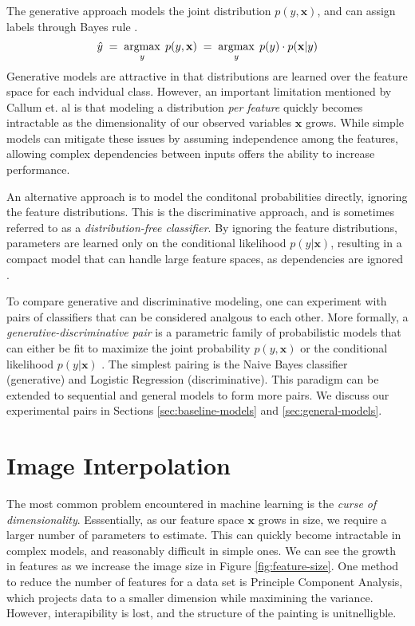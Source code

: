 \documentclass{article}
\DeclareMathOperator*{\argmax}{argmax}
\begin{document}
The generative approach models the joint distribution $p(y, \mathbf{x})$,
and can assign labels through Bayes rule \cite{NgJordan}.
\begin{equation}
    \hat{y} \; = \; \argmax_y \; p(y, \mathbf{x}) \; = \; \argmax_y \; p(y) \cdot p(\mathbf{x} | y) \\
\end{equation}
Generative models are attractive in that distributions are learned over the
feature space for each indvidual class. However, an important limitation
mentioned by Callum et. al \cite{McCallumCRF} is that modeling a distribution
\textit{per feature} quickly becomes intractable as the dimensionality of our
observed variables $\mathbf{x}$ grows. While simple models can mitigate
these issues by assuming independence among the features, allowing complex
dependencies between inputs offers the ability to increase performance.

An alternative approach is to model the conditonal probabilities directly,
ignoring the feature distributions. This is the discriminative approach,
and is sometimes referred to as a \textit{distribution-free classifier}.
By ignoring the feature distributions, parameters are learned only on the
conditional likelihood $p(y | \mathbf{x})$, resulting in a compact model
that can handle large feature spaces, as dependencies
are ignored \cite{McCallumCRF}.

To compare generative and discriminative modeling, one can experiment
with pairs of classifiers that can be considered analgous to each other.
More formally, a \textit{generative-discriminative pair} is a parametric
family of probabilistic models that can either be fit to maximize the joint
probability $p(y, \mathbf{x})$ or the conditional
likelihood $p(y | \mathbf{x})$ \cite{NgJordan}. The simplest pairing is
the Naive Bayes classifier (generative) and Logistic Regression
(discriminative). This paradigm can be extended to sequential and general
models to form more pairs. We discuss our experimental pairs
in Sections \ref{sec:baseline-models} and \ref{sec:general-models}.




\section{Image Interpolation}
\label{sec:img-interpolation}
The most common problem encountered in machine learning is the
\textit{curse of dimensionality}. Esssentially, as our feature space
$\mathbf{x}$ grows in size, we require a larger number of parameters to
estimate. This can quickly become intractable in complex models, and
reasonably difficult in simple ones. We can see the growth
in features as we increase the image size in Figure \ref{fig:feature-size}.
One method to reduce the number of
features for a data set is Principle Component Analysis, which projects
data to a smaller dimension while maximining the variance. However,
interapibility is lost, and the structure of the painting is unitnelligble.
\end{document}
